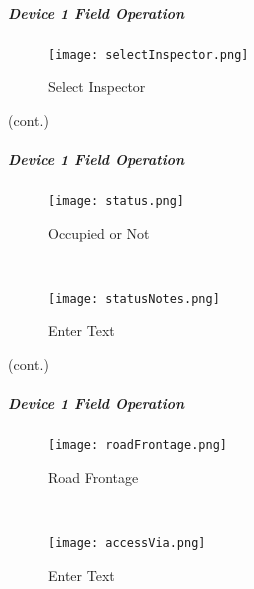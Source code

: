 \subparagraph*{Device 1 Field Operation}
 \begin{wrapfigure}{r}{0.6\textwidth}
 \centering
     \texttt{[image: selectInspector.png]}
\caption{Select Inspector}

 \vspace{3in}

 \end{wrapfigure}
  

 {\footnotesize (cont.)}
 \vspace{.8in}
 

\clearpage

 \subparagraph*{Device 1 Field Operation}
 \begin{wrapfigure}{r}{0.6\textwidth}
 \centering
     \texttt{[image: status.png]}
 \caption {Occupied or Not}
 \vspace{.05in}

 \HRule \\[.4cm] %
 \vspace{.05in}

     \texttt{[image: statusNotes.png]}
 \caption{Enter Text}
 \end{wrapfigure}
 

 {\footnotesize (cont.)}
 \vspace{.8in}


 \vspace{4in}


 \clearpage
 
 
  \subparagraph*{Device 1 Field Operation}
 \begin{wrapfigure}{r}{0.6\textwidth}
 \centering
     \texttt{[image: roadFrontage.png]}
     \vspace{-.1in}
     
 \caption{Road Frontage} 
 
 \vspace{.05in}

 \HRule \\[.4cm] %
 \vspace{.05in}
 
    \texttt{[image: accessVia.png]}
 \caption {Enter Text}
 
 \end{wrapfigure}
 
